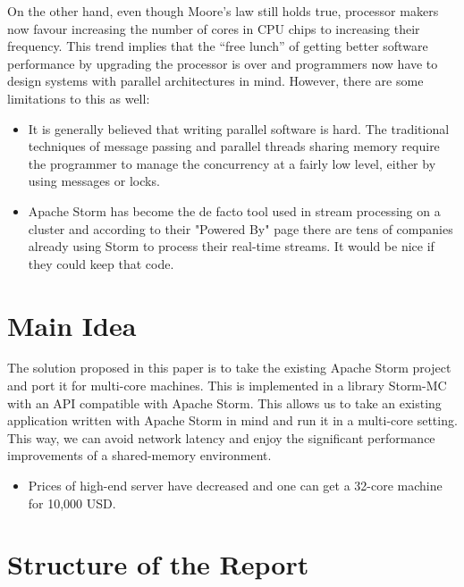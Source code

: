\documentclass[bsc,logo,frontabs,twoside,singlespacing,normalheadings,parskip]{infthesis}     %
\begin{document}
On the other hand, even though Moore’s law still holds true, processor makers now favour increasing the number of cores in CPU chips to increasing their frequency. This trend implies that the “free lunch” of getting better software performance by upgrading the processor is over and programmers now have to design systems with parallel architectures in mind. However, there are some limitations to this as well:

\begin{itemize}

\item It is generally believed that writing parallel software is hard. The traditional techniques of message passing and parallel threads sharing memory require the programmer to manage the concurrency at a fairly low level, either by using messages or locks.

\item Apache Storm has become the de facto tool used in stream processing on a cluster and according to their "Powered By" page \cite{Anonymous:eikzOt4-} there are tens of companies already using Storm to process their real-time streams. It would be nice if they could keep that code.

\end{itemize}

\section{Main Idea}

The solution proposed in this paper is to take the existing Apache Storm project and port it for multi-core machines. This is implemented in a library Storm-MC with an API compatible with Apache Storm. This allows us to take an existing application written with Apache Storm in mind and run it in a multi-core setting. This way, we can avoid network latency and enjoy the significant performance improvements of a shared-memory environment.

\begin{itemize}

	\item Prices of high-end server have decreased and one can get a 32-core machine for 10,000 USD.

\end{itemize}

\section{Structure of the Report}
\end{document}
